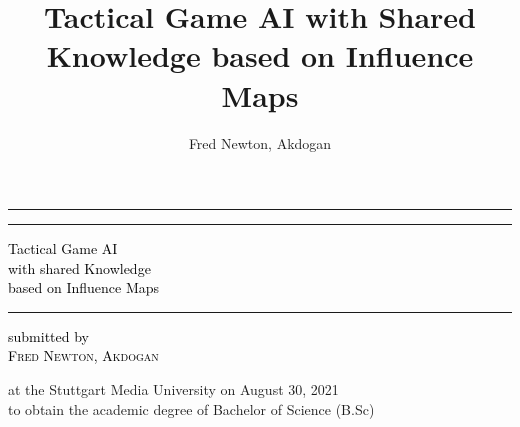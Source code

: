 \documentclass[]{report}
\title{Tactical Game AI with Shared Knowledge based on Influence Maps}
\author{Fred Newton, Akdogan}
\begin{document}
	
	
	\begin{titlepage}
		\centering
		
		
		\rule{\textwidth}{1pt} %
		
		\vspace{2pt}\vspace{-\baselineskip} %
		
		\rule{\textwidth}{0.4pt} %
		{\small {}}
		\vspace{0.1\textheight} %
		
		
		
		\textcolor{black}{ %
			{\Huge Tactical Game AI}\\[0.5\baselineskip] %
			{\Huge with shared Knowledge}\\[0.5\baselineskip] %
			{\Huge based on Influence Maps} %
		}
		
		\vspace{0.025\textheight}
		
		\rule{0.8\textwidth}{0.4pt}
		
		\vspace{0.1\textheight}
		
		
		\textcolor{black}{ %
			{\small submitted by}\\[0.5\baselineskip] %
			{\Large \textsc{Fred Newton, Akdogan}}\\[0.5\baselineskip] %
		}
		
		\vspace{0.025\textheight} %
		
		{\small at the Stuttgart Media University on August 30, 2021\\[0.5\baselineskip]}
		{\small to obtain the academic degree of Bachelor of Science (B.Sc)\\[0.5\baselineskip]}
		

\end{titlepage}
\end{document}
